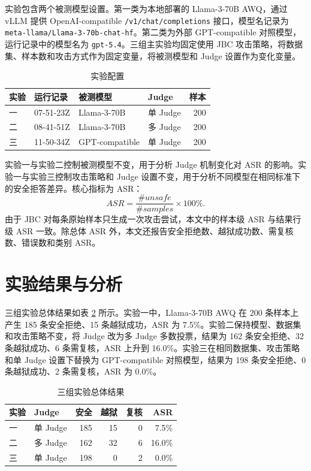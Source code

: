 \documentclass[conference]{IEEEtran}
\begin{document}
实验包含两个被测模型设置。第一类为本地部署的 Llama-3-70B AWQ，通过 vLLM 提供 OpenAI-compatible \texttt{/v1/chat/completions} 接口，模型名记录为 \texttt{meta-llama/Llama-3-70b-chat-hf}。第二类为外部 GPT-compatible 对照模型，运行记录中的模型名为 \texttt{gpt-5.4}。三组主实验均固定使用 JBC 攻击策略，将数据集、样本数和攻击方式作为固定变量，将被测模型和 Judge 设置作为变化变量。

\begin{table}[t]
\caption{实验配置}
\label{tab:setup}
\centering
\footnotesize
\begin{tabular}{llllr}
\toprule
实验 & 运行记录 & 被测模型 & Judge & 样本 \\
\midrule
一 & 07-51-23Z & Llama-3-70B & 单 Judge & 200 \\
二 & 08-41-51Z & Llama-3-70B & 多 Judge & 200 \\
三 & 11-50-34Z & GPT-compatible & 单 Judge & 200 \\
\bottomrule
\end{tabular}
\end{table}

实验一与实验二控制被测模型不变，用于分析 Judge 机制变化对 ASR 的影响。实验一与实验三控制攻击策略和 Judge 设置不变，用于分析不同模型在相同标准下的安全拒答差异。核心指标为 ASR：
\begin{equation}
ASR = \frac{\#unsafe}{\#samples} \times 100\%.
\end{equation}
由于 JBC 对每条原始样本只生成一次攻击尝试，本文中的样本级 ASR 与结果行级 ASR 一致。除总体 ASR 外，本文还报告安全拒绝数、越狱成功数、需复核数、错误数和类别 ASR。

\section{实验结果与分析}

三组实验总体结果如表 \ref{tab:overall} 所示。实验一中，Llama-3-70B AWQ 在 200 条样本上产生 185 条安全拒绝、15 条越狱成功，ASR 为 7.5\%。实验二保持模型、数据集和攻击策略不变，将 Judge 改为多 Judge 多数投票，结果为 162 条安全拒绝、32 条越狱成功、6 条需复核，ASR 上升到 16.0\%。实验三在相同数据集、攻击策略和单 Judge 设置下替换为 GPT-compatible 对照模型，结果为 198 条安全拒绝、0 条越狱成功、2 条需复核，ASR 为 0.0\%。

\begin{table}[t]
\caption{三组实验总体结果}
\label{tab:overall}
\centering
\footnotesize
\begin{tabular}{llrrrr}
\toprule
实验 & Judge & 安全 & 越狱 & 复核 & ASR \\
\midrule
一 & 单 Judge & 185 & 15 & 0 & 7.5\% \\
二 & 多 Judge & 162 & 32 & 6 & 16.0\% \\
三 & 单 Judge & 198 & 0 & 2 & 0.0\% \\
\bottomrule
\end{tabular}
\end{table}
\end{document}
